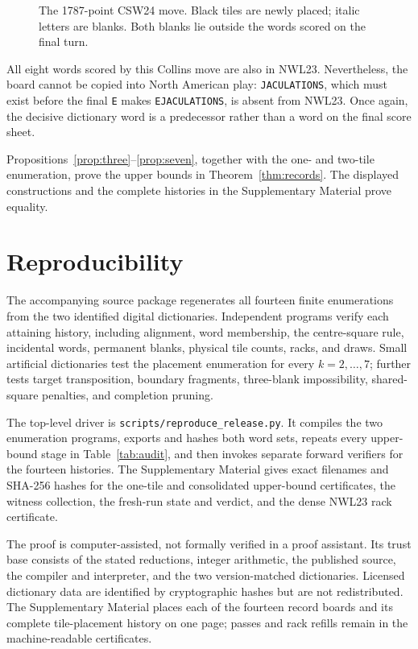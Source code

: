 \documentclass{article}
\theoremstyle{plain}
\newcommand{\word}[1]{\texttt{#1}}
\begin{document}
\begin{figure}[t]\centering

\caption{The 1787-point CSW24 move. Black tiles are newly placed; italic letters
are blanks. Both blanks lie outside the words scored on the final turn.}
\label{fig:seven}
\end{figure}

All eight words scored by this Collins move are also in NWL23. Nevertheless,
the board cannot be copied into North American play: \word{JACULATIONS}, which
must exist before the final \word{E} makes \word{EJACULATIONS}, is absent from
NWL23. Once again, the decisive dictionary word is a predecessor rather than a
word on the final score sheet.

Propositions~\ref{prop:three}--\ref{prop:seven}, together with the one- and
two-tile enumeration, prove the upper bounds in Theorem~\ref{thm:records}. The
displayed constructions and the complete histories in the Supplementary
Material prove equality.

\section{Reproducibility}

The accompanying source package regenerates all fourteen finite enumerations
from the two identified digital dictionaries. Independent programs verify each
attaining history, including alignment, word membership, the centre-square
rule, incidental words, permanent blanks, physical tile counts, racks, and
draws. Small artificial dictionaries test the placement enumeration for every
$k=2,\ldots,7$; further tests target transposition, boundary fragments,
three-blank impossibility, shared-square penalties, and completion pruning.

The top-level driver is \word{scripts/reproduce\_release.py}. It compiles the
two enumeration programs, exports and hashes both word sets, repeats every
upper-bound stage in Table~\ref{tab:audit}, and then invokes separate forward
verifiers for the fourteen histories. The Supplementary Material gives exact
filenames and SHA-256 hashes for the one-tile and consolidated upper-bound
certificates, the witness collection, the fresh-run state and verdict, and the
dense NWL23 rack certificate.

The proof is computer-assisted, not formally verified in a proof assistant.
Its trust base consists of the stated reductions, integer arithmetic, the
published source, the compiler and interpreter, and the two version-matched
dictionaries. Licensed dictionary data are identified by cryptographic hashes
but are not redistributed. The Supplementary Material places each of the
fourteen record boards and its complete tile-placement history on one page;
passes and rack refills remain in the machine-readable certificates.
\end{document}
